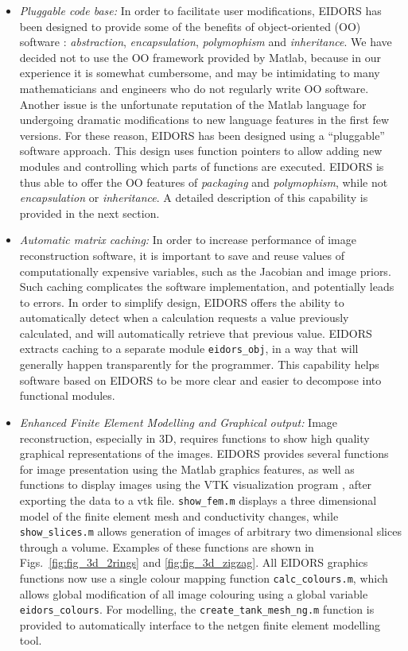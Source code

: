 \documentclass[12pt]{iopart}
\begin{document}
\begin{itemize}
  \item {\em Pluggable code base:}
In order to facilitate user modifications, EIDORS
has been designed to provide some of the benefits of
object-oriented (OO) software \cite{Gamma_etal_1995}:
{\em abstraction}, {\em encapsulation}, 
{\em polymophism} and {\em inheritance}.
We have decided not to
use the OO framework provided by Matlab, because
in our experience it is somewhat cumbersome,
and may be intimidating
to many mathematicians and engineers who do not 
regularly write OO software.
Another issue is the unfortunate reputation of
the Matlab language for undergoing dramatic modifications to new
language features in the first few versions.
For these reason, EIDORS has been designed using
a  ``pluggable'' software approach.
This design uses function
pointers to allow adding new modules and controlling
which parts of functions are executed.
EIDORS is thus able to offer the OO features 
of {\em packaging} and {\em polymophism}, while
not {\em encapsulation} or {\em inheritance}.
A detailed description of this capability is
provided in the next section.

  \item {\em Automatic matrix caching:}
In order to increase
performance of image reconstruction software, it is important to save
and reuse values of 
computationally expensive variables, such as the Jacobian and image priors.
Such caching complicates the software implementation, and
potentially leads to errors. In order to simplify design, EIDORS
offers the ability to automatically detect when a calculation
requests a value previously calculated, and will automatically
retrieve that previous value.
EIDORS extracts caching to a separate module {\tt eidors\_obj},
in a way that will generally happen transparently for the
programmer. This capability helps software based on EIDORS
to be more clear and easier to decompose into functional
modules.


  \item {\em Enhanced Finite Element Modelling and Graphical output:}
Image reconstruction, especially in 3D, requires functions
to show high quality graphical representations of the images.
EIDORS provides several functions for image presentation using
the Matlab graphics features, as well as functions to 
display images using the VTK visualization program 
\cite{Ramachandran_2003}, after exporting the data to a vtk file.
{\tt show\_fem.m} displays a three dimensional model of the
finite element mesh and conductivity changes, while
{\tt show\_slices.m} allows generation of images of arbitrary
two dimensional slices through a volume. Examples of these
functions are shown in Figs.~\ref{fig:fig_3d_2rings} and
 \ref{fig:fig_3d_zigzag}.
All EIDORS graphics functions now use a single colour
mapping function {\tt calc\_colours.m}, which allows
global modification of all image colouring using a
global variable {\tt eidors\_colours}.
For modelling, the {\tt create\_tank\_mesh\_ng.m}
function is provided to automatically interface to the
netgen \cite{Schoberl_1997} finite element modelling
tool.



\end{itemize}
\end{document}
